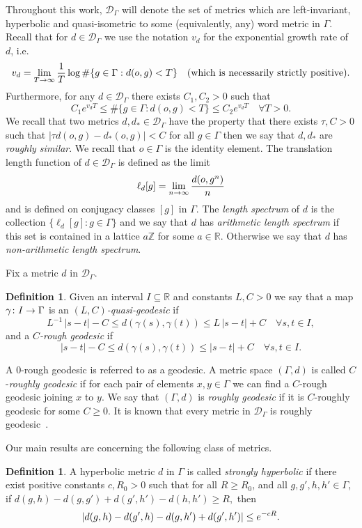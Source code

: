 \documentclass[10pt]{amsart}
\theoremstyle{definition}\newtheorem{defi}[theo]{Definition}\newtheorem{rema}[theo]{Remark}\newtheorem{exam}[theo]{Example}\newtheorem{exem}[theo]{Example}\newtheorem{nota}[theo]{Notation}
\newcommand{\g}{\gamma}
\newcommand{\G}{\Gamma}
\newcommand{\Dc}{\mathcal{D}}
\newcommand{\R}{\mathbb{R}}
\newcommand{\Z}{\mathbb{Z}}
\let\originalleft\left
\let\originalright\right
\renewcommand{\left}{\mathopen{}\mathclose\bgroup\originalleft}
\renewcommand{\right}{\aftergroup\egroup\originalright}
\renewcommand*{\to}{\mathchoice{\longrightarrow}{\rightarrow}{\rightarrow}{\rightarrow}}
\theoremstyle{plain}
\let\oldforall\forall
\renewcommand*{\forall}{\mathrel{\oldforall}}
\begin{document}
Throughout this work, $\Dc_\G$ will denote the set of metrics which are left-invariant, hyperbolic and quasi-isometric to some (equivalently, any) word metric in $\G$. Recall that for $d\in \Dc_\G$ we use the notation $v_d$ for the exponential growth rate of $d$, i.e.
\[
v_d = \lim_{T\to\infty} \frac{1}{T} \log \#\{ g\in\G: d(o,g) < T\} \quad \text{(which is necessarily strictly positive)}.
\]
Furthermore, for any $d \in \Dc_\G$ there exists $C_1, C_2 > 0$ such that
\[
C_1 e^{v_d T} \le \#\{g \in \G: d(o,g) < T\} \le C_2 e^{v_d T} \quad \forall T > 0.
\]
We recall that two metrics $d,d_\ast \in \Dc_\G$ have the property that there exists $\tau, C >0$ such that $|\tau d(o,g) - d_\ast(o,g)| < C$ for all $g\in\G$ then we say that $d,d_\ast$ are \emph{roughly similar}. We recall that $o\in\G$ is the identity element. The translation length function of $d \in \Dc_\G$ is defined as the limit
\[
\ell_d[g] = \lim_{n\to\infty} \frac{d(o,g^n)}{n}
\]
and is defined on conjugacy classes $[g]$ in $\G$. The \emph{length spectrum} of $d$ is the collection $\{ \ell_d[g] : g \in \G\}$ and we say that $d$ has \emph{arithmetic length spectrum} if this set is contained in a lattice $a \Z$ for some $a \in \R$. Otherwise we say that $d$ has \emph{non-arithmetic length spectrum}.

Fix a metric $d$ in $\Dc_\G$.

\begin{defi}\label{def.geo}
Given an interval $I \subseteq \R$ and constants $L, C >0$ we say that a map $\g\colon I \to \G$ is an \emph{$(L, C)$-quasi-geodesic} if
\[
L^{-1} \, |s-t|-C \le d(\g(s), \g(t)) \le L\, |s-t|+C \quad \forall s, t \in I,
\]
and a \emph{$C$-rough geodesic} if
\[
|s-t|-C \le d(\gamma(s), \gamma(t))\le |s-t|+C \quad \forall s, t \in I.
\]
\end{defi}

A $0$-rough geodesic is referred to as a geodesic. A metric space $(\G, d)$ is called $C$-\emph{roughly geodesic} if for each pair of elements $x, y \in \G$ we can find a $C$-rough geodesic joining $x$ to $y$. We say that $(\G,d)$ is \emph{roughly geodesic} if it is $C$-roughly geodesic for some $C \ge 0$. It is known that every metric in $\Dc_\G$ is roughly geodesic~\cite{BonkSchramm}.


Our main results are concerning the following class of metrics.

\begin{defi}
A hyperbolic metric $d$ in $\G$ is called \emph{strongly hyperbolic} if there exist positive constants $c, R_0 > 0$ such that for all $R \ge R_0$, and all $g, g', h, h' \in \G$, if $ d(g, h)-d(g, g')+d(g', h')-d(h, h') \ge R,$ then
\[
\left|d(g, h)-d(g', h)-d(g, h')+d(g', h')\right| \le e^{-c R}.
\]
\end{defi}
\end{document}
